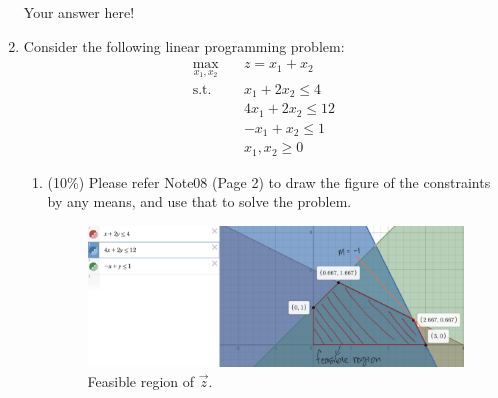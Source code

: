 \documentclass[a4paper,10pt]{article}
\begin{document}
\begin{enumerate}
{\color{blue}
    Your answer here!
}

\item Consider the following linear programming problem:
    \begin{equation}
        \begin{aligned}
            \max_{x_1,x_2} \quad & z=x_1+x_2 \\
            \textrm{s.t.} \quad & x_1 + 2x_2 \le 4  \\
                \quad& 4x_1 + 2x_2 \le 12   \\
                \quad& -x_1 + x_2 \le 1   \\
                \quad& x_1, x_2 \ge 0
        \end{aligned}
    \end{equation}

    \begin{enumerate}
        \item (10\%) Please refer Note08 (Page 2) to draw the figure of the constraints by any means, and use that to solve the problem. 
        {\color{blue} 
            \begin{figure}[H]
                \centering
                \includegraphics[scale=0.15]{./4a.png}
                \caption{Feasible region of $\vec{z}$.}
            \end{figure}
        }


\end{enumerate}
\end{enumerate}
\end{document}
